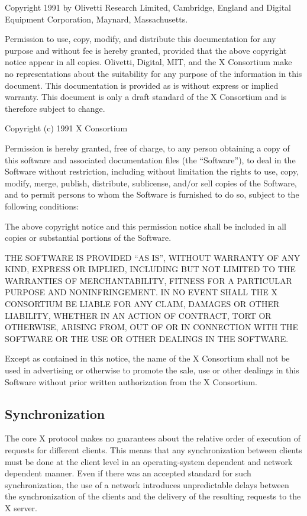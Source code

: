 Copyright 1991 by Olivetti Research Limited, Cambridge, England and
Digital Equipment Corporation, Maynard, Massachusetts.

{\small Permission to use, copy, modify, and distribute this documentation
for any purpose and without fee is hereby granted, provided that the above
copyright notice appear in all copies. Olivetti, Digital, MIT, and the
X Consortium
make no representations about the suitability for any purpose of the
information in this document. This documentation is provided as is without
express or implied warranty. This document is only a draft standard of the
X Consortium and is therefore subject to change.}

Copyright (c) 1991 X Consortium

{\small Permission is hereby granted, free of charge, to any person obtaining a copy
of this software and associated documentation files (the ``Software''), to deal
in the Software without restriction, including without limitation the rights
to use, copy, modify, merge, publish, distribute, sublicense, and/or sell
copies of the Software, and to permit persons to whom the Software is
furnished to do so, subject to the following conditions:

The above copyright notice and this permission notice shall be included in
all copies or substantial portions of the Software.

THE SOFTWARE IS PROVIDED ``AS IS'', WITHOUT WARRANTY OF ANY KIND, EXPRESS OR
IMPLIED, INCLUDING BUT NOT LIMITED TO THE WARRANTIES OF MERCHANTABILITY,
FITNESS FOR A PARTICULAR PURPOSE AND NONINFRINGEMENT.  IN NO EVENT SHALL THE
X CONSORTIUM BE LIABLE FOR ANY CLAIM, DAMAGES OR OTHER LIABILITY, WHETHER IN
AN ACTION OF CONTRACT, TORT OR OTHERWISE, ARISING FROM, OUT OF OR IN
CONNECTION WITH THE SOFTWARE OR THE USE OR OTHER DEALINGS IN THE SOFTWARE.

Except as contained in this notice, the name of the X Consortium shall not be
used in advertising or otherwise to promote the sale, use or other dealings
in this Software without prior written authorization from the X Consortium.}
\eject

\subsection*{Synchronization}

The core X protocol makes no guarantees about the relative order of execution
of requests for different clients. This means that any synchronization between
clients must be done at the client level in an operating-system dependent and
network dependent manner. Even if there was an accepted standard for such
synchronization, the use of a network introduces unpredictable delays between
the synchronization of the clients and the delivery of the resulting requests
to the X server.

